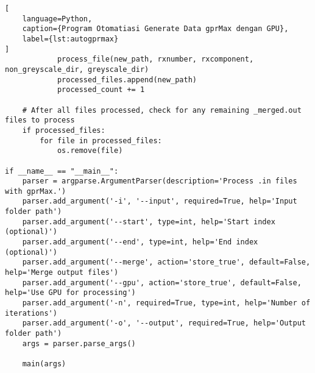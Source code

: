 \begin{lstlisting}[
    language=Python,
    caption={Program Otomatiasi Generate Data gprMax dengan GPU},
    label={lst:autogprmax}
]
            process_file(new_path, rxnumber, rxcomponent, non_greyscale_dir, greyscale_dir)
            processed_files.append(new_path)
            processed_count += 1

    # After all files processed, check for any remaining _merged.out files to process
    if processed_files:
        for file in processed_files:
            os.remove(file)

if __name__ == "__main__":
    parser = argparse.ArgumentParser(description='Process .in files with gprMax.')
    parser.add_argument('-i', '--input', required=True, help='Input folder path')
    parser.add_argument('--start', type=int, help='Start index (optional)')
    parser.add_argument('--end', type=int, help='End index (optional)')
    parser.add_argument('--merge', action='store_true', default=False, help='Merge output files')
    parser.add_argument('--gpu', action='store_true', default=False, help='Use GPU for processing')
    parser.add_argument('-n', required=True, type=int, help='Number of iterations')
    parser.add_argument('-o', '--output', required=True, help='Output folder path')
    args = parser.parse_args()

    main(args)


\end{lstlisting}

